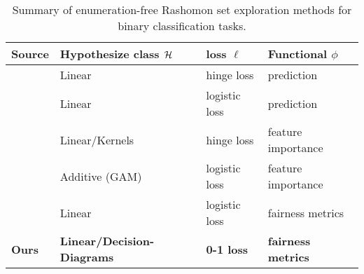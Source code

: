 \begin{table*}[t]
    \caption{Summary of enumeration-free Rashomon set exploration methods for binary classification tasks.}
    \label{tab:rashomon}
    \begin{tabular}{llll}
    \toprule
    Source   & Hypothesize class $\mathcal{H}$     & loss $\ell$             & Functional $\phi$ \\
    \midrule
    \citet{coker2021theory}  & Linear & hinge loss   & prediction\\
    \citet{DBLP:conf/aaai/Watson-DanielsP23}  & Linear   & logistic loss & prediction \\
    \citet{fisher2019all} & Linear/Kernels  & hinge loss  & feature importance \\
    \citet{zhong2024exploring} & Additive (GAM) & logistic loss  & feature importance \\
    \citet{coston2021characterizing} & Linear  & logistic loss & fairness metrics \\
    \textbf{Ours}   & \textbf{Linear/Decision-Diagrams} & \textbf{0-1 loss}  & \textbf{fairness metrics}\\
    \bottomrule
    \end{tabular}
\end{table*}
